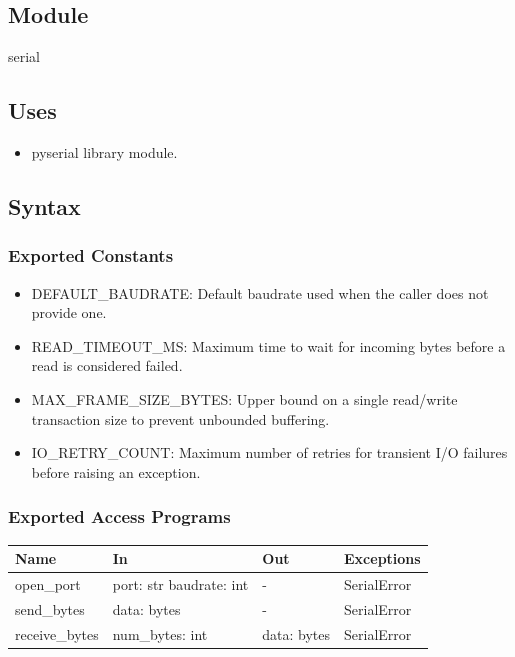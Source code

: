\documentclass[12pt, titlepage]{article}
\begin{document}
\subsection{Module}

serial

\subsection{Uses}

\begin{itemize}
  \item pyserial library module.
\end{itemize}

\subsection{Syntax}

\subsubsection{Exported Constants}

\begin{itemize}
  \item DEFAULT\_BAUDRATE: Default baudrate used when the caller does not provide one.
  \item READ\_TIMEOUT\_MS: Maximum time to wait for incoming bytes before a read is
        considered failed.
  \item MAX\_FRAME\_SIZE\_BYTES: Upper bound on a single read/write transaction size to
        prevent unbounded buffering.
  \item IO\_RETRY\_COUNT: Maximum number of retries for transient I/O failures before
        raising an exception.
\end{itemize}

\subsubsection{Exported Access Programs}

\begin{center}
  \begin{tabular}{p{3cm} p{4cm} p{4cm} p{3.5cm}}
    \hline
    \textbf{Name}  & \textbf{In}                      & \textbf{Out} & \textbf{Exceptions} \\
    \hline
    open\_port     & port: str \newline baudrate: int & -            & SerialError         \\
    \hline
    send\_bytes    & data: bytes                      & -            & SerialError         \\
    \hline
    receive\_bytes & num\_bytes: int                  & data: bytes  & SerialError         \\
    \hline
  \end{tabular}
\end{center}
\end{document}
